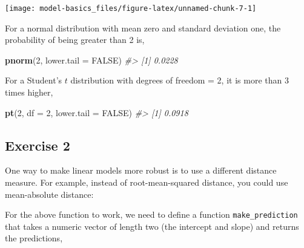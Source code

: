 \documentclass[]{book}
\newenvironment{Shaded}{\begin{snugshade}}{\end{snugshade}}
\newcommand{\CommentTok}[1]{\textcolor[rgb]{0.56,0.35,0.01}{\textit{#1}}}
\newcommand{\ControlFlowTok}[1]{\textcolor[rgb]{0.13,0.29,0.53}{\textbf{#1}}}
\newcommand{\DataTypeTok}[1]{\textcolor[rgb]{0.13,0.29,0.53}{#1}}
\newcommand{\DecValTok}[1]{\textcolor[rgb]{0.00,0.00,0.81}{#1}}
\newcommand{\KeywordTok}[1]{\textcolor[rgb]{0.13,0.29,0.53}{\textbf{#1}}}
\newcommand{\NormalTok}[1]{#1}
\newcommand{\OperatorTok}[1]{\textcolor[rgb]{0.81,0.36,0.00}{\textbf{#1}}}
\newcommand{\OtherTok}[1]{\textcolor[rgb]{0.56,0.35,0.01}{#1}}
\newcommand{\StringTok}[1]{\textcolor[rgb]{0.31,0.60,0.02}{#1}}
\theoremstyle{plain}
\theoremstyle{remark}
\theoremstyle{definition}
\theoremstyle{definition}
\theoremstyle{definition}
\theoremstyle{remark}
\begin{document}
\begin{center}\texttt{[image: model-basics\_files/figure-latex/unnamed-chunk-7-1]} \end{center}

For a normal distribution with mean zero and standard deviation one, the
probability of being greater than 2 is,

\begin{Shaded}
\begin{Highlighting}[]
\KeywordTok{pnorm}\NormalTok{(}\DecValTok{2}\NormalTok{, }\DataTypeTok{lower.tail =} \OtherTok{FALSE}\NormalTok{)}
\CommentTok{#> [1] 0.0228}
\end{Highlighting}
\end{Shaded}

For a Student's \(t\) distribution with degrees of freedom = 2, it is
more than 3 times higher,

\begin{Shaded}
\begin{Highlighting}[]
\KeywordTok{pt}\NormalTok{(}\DecValTok{2}\NormalTok{, }\DataTypeTok{df =} \DecValTok{2}\NormalTok{, }\DataTypeTok{lower.tail =} \OtherTok{FALSE}\NormalTok{)}
\CommentTok{#> [1] 0.0918}
\end{Highlighting}
\end{Shaded}

\hypertarget{exercise-2-60}{%
\subsection{Exercise 2}\label{exercise-2-60}}

One way to make linear models more robust is to use a different distance
measure. For example, instead of root-mean-squared distance, you could
use mean-absolute distance:

\begin{Shaded}
\end{Shaded}

For the above function to work, we need to define a function
\texttt{make\_prediction} that takes a numeric vector of length two (the
intercept and slope) and returns the predictions,
\end{document}
